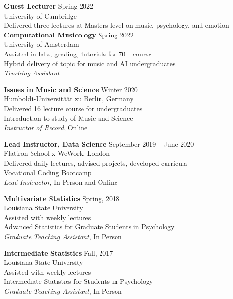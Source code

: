 \documentclass[11pt]{res} %
\begin{document}
\begin{resume}
\textbf{Guest Lecturer} \hfill Spring 2022\\
University of Cambridge\\
Delivered three lectures at Masters level on music, psychology, and emotion \\

\textbf{Computational Musicology} \hfill Spring 2022\\
University of Amsterdam \\
Assisted in labs, grading, tutorials for 70+ course\\
Hybrid delivery of topic for music and AI undergraduates\\
\textit{Teaching Assistant}

\textbf{Issues in Music and Science} \hfill Winter 2020\\
Humboldt-Universit{\"a}ät zu Berlin, Germany\\
Delivered 16 lecture course for undergraduates\\
Introduction to study of Music and Science\\
\textit{Instructor of Record}, Online

\textbf{Lead Instructor, Data Science} \hfill September 2019 -- June 2020\\
Flatiron School x WeWork, London\\
Delivered daily lectures, advised projects, developed curricula\\
Vocational Coding Bootcamp\\
\textit{Lead Instructor}, In Person and Online 

\textbf{Multivariate Statistics} \hfill  Spring, 2018\\
Louisiana State University\\
Assisted with weekly lectures\\
Advanced Statistics for Graduate Students in Psychology\\
\textit{Graduate Teaching Assistant}, In Person

\textbf{Intermediate Statistics} \hfill  Fall, 2017\\
Louisiana State University\\
Assisted with weekly lectures\\
Intermediate Statistics for Students in Psychology\\
\textit{Graduate Teaching Assistant}, In Person


\end{resume}
\end{document}

